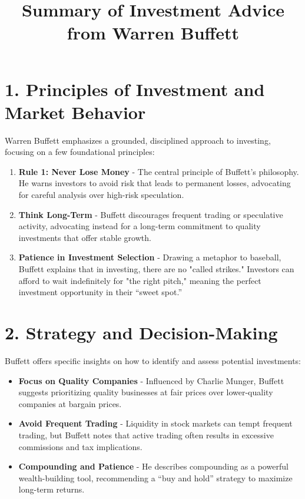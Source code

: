 \documentclass{article}
\title{Summary of Investment Advice from Warren Buffett}
\author{}
\date{}
\begin{document}
\maketitle

\section*{1. Principles of Investment and Market Behavior}
Warren Buffett emphasizes a grounded, disciplined approach to investing, focusing on a few foundational principles:

\begin{enumerate}[label=\arabic*.]
    \item \textbf{Rule 1: Never Lose Money} - The central principle of Buffett’s philosophy. He warns investors to avoid risk that leads to permanent losses, advocating for careful analysis over high-risk speculation.
    \item \textbf{Think Long-Term} - Buffett discourages frequent trading or speculative activity, advocating instead for a long-term commitment to quality investments that offer stable growth.
    \item \textbf{Patience in Investment Selection} - Drawing a metaphor to baseball, Buffett explains that in investing, there are no "called strikes." Investors can afford to wait indefinitely for "the right pitch," meaning the perfect investment opportunity in their “sweet spot.”
\end{enumerate}

\section*{2. Strategy and Decision-Making}
Buffett offers specific insights on how to identify and assess potential investments:

\begin{itemize}
    \item \textbf{Focus on Quality Companies} - Influenced by Charlie Munger, Buffett suggests prioritizing quality businesses at fair prices over lower-quality companies at bargain prices.
    \item \textbf{Avoid Frequent Trading} - Liquidity in stock markets can tempt frequent trading, but Buffett notes that active trading often results in excessive commissions and tax implications.
    \item \textbf{Compounding and Patience} - He describes compounding as a powerful wealth-building tool, recommending a “buy and hold” strategy to maximize long-term returns.
\end{itemize}
\end{document}
